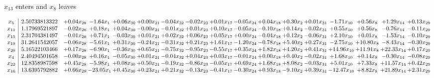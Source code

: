 \documentclass[9pt]{article}
\begin{document}
 $ x_{13} $ enters and $ x_{8} $ leaves 

 \[\begin{array}{c| c c@{\hskip 2pt} c@{\hskip 2pt} c@{\hskip 2pt} c@{\hskip 2pt} c@{\hskip 2pt} c@{\hskip 2pt} c@{\hskip 2pt} c@{\hskip 2pt} c@{\hskip 2pt} c@{\hskip 2pt} c@{\hskip 2pt} c@{\hskip 2pt} c@{\hskip 2pt} c@{\hskip 2pt} c@{\hskip 2pt} }
 x_{5}   &  2.50733813322 & +  0.04 x_{28} & -1.64 x_{1} & +  0.06 x_{30} & +  0.00 x_{21} & -0.04 x_{32} & -0.02 x_{23} & +  0.01 x_{17} & -0.05 x_{24} & +  0.04 x_{18} & +  0.30 x_{2} & +  0.01 x_{31} & -1.71 x_{10} & +  0.56 x_{8} & +  1.29 x_{14} & +  0.13 x_{29}\\
 x_{11}   &  1.17969521897 & -0.02 x_{28} & +  0.18 x_{1} & +  0.04 x_{30} & -0.00 x_{21} & -0.01 x_{32} & +  0.01 x_{23} & +  0.10 x_{17} & -0.05 x_{24} & -0.10 x_{18} & +  0.14 x_{2} & -0.02 x_{31} & +  0.55 x_{10} & +  0.56 x_{8} & -0.76 x_{14} & -0.11 x_{29}\\
 x_{15}   &  2.31704381497 & -0.01 x_{28} & +  0.71 x_{1} & -0.03 x_{30} & +  0.01 x_{21} & +  0.02 x_{32} & +  0.06 x_{23} & +  0.05 x_{17} & +  0.00 x_{24} & -0.04 x_{18} & +  0.12 x_{2} & -0.06 x_{31} & +  2.10 x_{10} & +  0.01 x_{8} & -1.53 x_{14} & -0.10 x_{29}\\
 x_{19}   &  31.2641542057 & -0.06 x_{28} & -5.61 x_{1} & +  0.31 x_{30} & -0.24 x_{21} & -0.31 x_{32} & +  0.21 x_{23} & +  1.61 x_{17} & -1.20 x_{24} & -0.78 x_{18} & +  5.40 x_{2} & +  0.27 x_{31} & -2.75 x_{10} & + 10.80 x_{8} & -8.43 x_{14} & -0.30 x_{29}\\
 x_{20}   &  5.16522103466 & +  0.17 x_{28} & -6.90 x_{1} & -0.36 x_{30} & +  0.65 x_{21} & -0.75 x_{32} & -0.95 x_{23} & -0.55 x_{17} & +  0.35 x_{24} & +  1.82 x_{18} & +  4.20 x_{2} & +  0.41 x_{31} & + 14.96 x_{10} & + 11.91 x_{8} & + 22.33 x_{14} & +  0.17 x_{29}\\
 x_{4}   &  2.40494501658 & -0.00 x_{28} & +  0.16 x_{1} & -0.05 x_{30} & +  0.01 x_{21} & -0.04 x_{32} & +  0.04 x_{23} & +  0.03 x_{17} & -0.01 x_{24} & +  0.00 x_{18} & +  0.40 x_{2} & -0.02 x_{31} & +  1.68 x_{10} & +  0.14 x_{8} & -0.30 x_{14} & -0.08 x_{29}\\
 x_{22}   &  12.8358987598 & +  0.45 x_{28} & -5.98 x_{1} & +  0.08 x_{30} & +  0.50 x_{21} & -0.19 x_{32} & -0.86 x_{23} & -0.05 x_{17} & +  0.69 x_{24} & +  1.68 x_{18} & +  8.08 x_{2} & -0.03 x_{31} & +  5.01 x_{10} & +  7.33 x_{8} & + 11.57 x_{14} & +  0.42 x_{29}\\
 x_{16}   &  13.6395792882 & +  0.66 x_{28} & -23.05 x_{1} & +  0.45 x_{30} & +  0.23 x_{21} & +  0.21 x_{32} & -0.13 x_{23} & -0.41 x_{17} & -0.30 x_{24} & +  0.93 x_{18} & -9.10 x_{2} & +  0.39 x_{31} & -12.47 x_{10} & +  8.82 x_{8} & + 21.89 x_{14} & +  2.31 x_{29}\\

\end{array}\]
\end{document}
